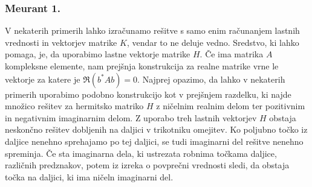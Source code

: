 \documentclass[12pt,a4paper]{amsart}
\theoremstyle{definition}
\newtheorem{opomba}[definicija]{Opomba}
\theoremstyle{plain}
\begin{document}
\subsubsection{Meurant 1.}
V nekaterih primerih lahko izračunamo rešitve s samo enim ra\-ču\-na\-njem lastnih vrednosti in vektorjev matrike $K$, vendar to ne deluje vedno. Sredstvo, ki lahko pomaga, je, da uporabimo lastne vektorje matrike $H$. 
Če ima matrika $A$ kompleksne elemente, nam prejšnja konstrukcija za realne matrike vrne le vektorje za katere je $\Re(b^\ast Ab)=0$. 
Najprej opazimo, da lahko v nekaterih primerih uporabimo podobno konstrukcijo kot v prejšnjem razdelku, ki najde množico rešitev za hermitsko matriko $H$ z ničelnim realnim delom ter pozitivnim in negativnim imaginarnim delom. 
Z uporabo treh lastnih vektorjev $H$ obstaja neskončno rešitev dobljenih na daljici v trikotniku omejitev. 
Ko poljubno točko iz daljice nenehno sprehajamo po tej daljici, se tudi imaginarni del rešitve nenehno spreminja. 
Če sta imaginarna dela, ki ustrezata robnima točkama daljice, različnih predznakov, potem iz izreka o povprečni vrednosti sledi, da obstaja točka na daljici, ki ima ničeln imaginarni del. 
\end{document}
